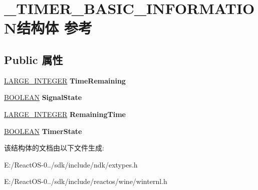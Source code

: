 \hypertarget{struct___t_i_m_e_r___b_a_s_i_c___i_n_f_o_r_m_a_t_i_o_n}{}\section{\+\_\+\+T\+I\+M\+E\+R\+\_\+\+B\+A\+S\+I\+C\+\_\+\+I\+N\+F\+O\+R\+M\+A\+T\+I\+O\+N结构体 参考}
\label{struct___t_i_m_e_r___b_a_s_i_c___i_n_f_o_r_m_a_t_i_o_n}
\subsection*{Public 属性}
\begin{DoxyCompactItemize}
\item 
\mbox{\label{struct___t_i_m_e_r___b_a_s_i_c___i_n_f_o_r_m_a_t_i_o_n_a95552e7e2fcbcac185732fb06c92e53f}} 
\hyperlink{union___l_a_r_g_e___i_n_t_e_g_e_r}{L\+A\+R\+G\+E\+\_\+\+I\+N\+T\+E\+G\+ER} {\bfseries Time\+Remaining}
\item 
\mbox{\label{struct___t_i_m_e_r___b_a_s_i_c___i_n_f_o_r_m_a_t_i_o_n_a939e2b084a5054926574f9093f4db71e}} 
\hyperlink{_processor_bind_8h_a112e3146cb38b6ee95e64d85842e380a}{B\+O\+O\+L\+E\+AN} {\bfseries Signal\+State}
\item 
\mbox{\label{struct___t_i_m_e_r___b_a_s_i_c___i_n_f_o_r_m_a_t_i_o_n_a97c9ad2da065c60d08379c6b05a08f00}} 
\hyperlink{union___l_a_r_g_e___i_n_t_e_g_e_r}{L\+A\+R\+G\+E\+\_\+\+I\+N\+T\+E\+G\+ER} {\bfseries Remaining\+Time}
\item 
\mbox{\label{struct___t_i_m_e_r___b_a_s_i_c___i_n_f_o_r_m_a_t_i_o_n_a9aad33b9e1a39a4fcaf9eaa724b00156}} 
\hyperlink{_processor_bind_8h_a112e3146cb38b6ee95e64d85842e380a}{B\+O\+O\+L\+E\+AN} {\bfseries Timer\+State}
\end{DoxyCompactItemize}


该结构体的文档由以下文件生成\+:\begin{DoxyCompactItemize}
\item 
E\+:/\+React\+O\+S-\/0../sdk/include/ndk/extypes.\+h\item 
E\+:/\+React\+O\+S-\/0../sdk/include/reactos/wine/winternl.\+h\end{DoxyCompactItemize}
